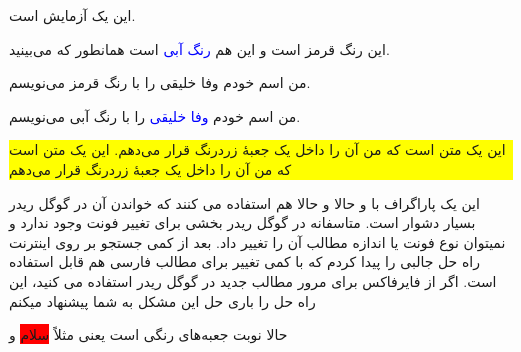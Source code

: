 \documentclass{article}
\begin{document}
این یک آزمایش است.

\bigskip
{}

این {\color{red} رنگ قرمز} است و این هم \textcolor{blue}{رنگ آبی} است همانطور که می‌بینید.

\bigskip
من اسم خودم {\color{red}  وفا خلیقی} را با رنگ قرمز می‌نویسم.

\bigskip
من اسم خودم \textcolor{blue}{وفا خلیقی} را با رنگ آبی می‌نویسم.

\bigskip
\colorbox{yellow}{\begin{minipage}{0.8\textwidth}
این یک متن است که من آن را داخل یک جعبهٔ زردرنگ قرار می‌دهم. این یک متن است که من آن را داخل یک جعبهٔ زردرنگ قرار می‌دهم
\end{minipage}}

\bigskip
این یک پاراگراف با  و حالا
 و حالا هم
استفاده می کنند که خواندن آن در گوگل ریدر بسیار دشوار است. متاسفانه در گوگل ریدر بخشی برای تغییر فونت وجود ندارد و نمیتوان نوع فونت یا اندازه مطالب آن را تغییر داد. بعد از کمی جستجو بر روی اینترنت راه حل جالبی را پیدا کردم که با کمی تغییر برای مطالب فارسی هم قابل استفاده است.
اگر از فایرفاکس برای مرور مطالب جدید در گوگل ریدر استفاده می کنید، این راه حل را باری حل این مشکل به شما پیشنهاد میکنم

\bigskip
حالا نوبت جعبه‌های رنگی است یعنی مثلاً \colorbox{red}{{\color{white}سلام}} و 
\end{document}
